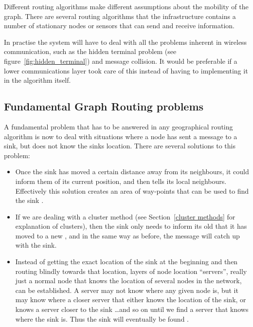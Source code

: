 Different routing algorithms make different assumptions about the mobility of the graph. There are several routing algorithms \cite{adaptive, two-tier} that the infrastructure contains a number of stationary nodes or sensors that can send and receive information. 


In practise the system will have to deal with all the problems inherent in wireless communication, such as the hidden terminal problem (see figure~\ref{fig:hidden_terminal}) and message collision. It would be preferable if a lower communications layer took care of this instead of having to implementing it in the algorithm itself.

\subsection{Fundamental Graph Routing problems}

A fundamental problem that has to be answered in any geographical routing algorithm is now to deal with situations where a node has sent a message to a sink, but does not know the sinks location. There are several solutions to this problem:

\begin{itemize}
\item Once the sink has moved a certain distance away from its neighbours, it could inform them of its current position, and then tells its local neighbours. Effectively this solution creates an area of way-points that can be used to find the sink .
\item If we are dealing with a cluster method (see Section~\ref{cluster methods} for explanation of clusters), then the sink only needs to inform its old \ch that it has moved to a new \ch, and in the same way as before, the message will catch up with the sink.
\item Instead of getting the exact location of the sink at the beginning and then routing blindly towards that location, layers of node location ``servers'', really just a normal node that knows the location of several nodes in the network, can be established. A server may not know where any given node is, but it may know where a closer server that either knows the location of the sink, or knows a server closer to the sink \ldots and so on until we find a server that knows where the sink is. Thus the sink will eventually be found .
\end{itemize}

